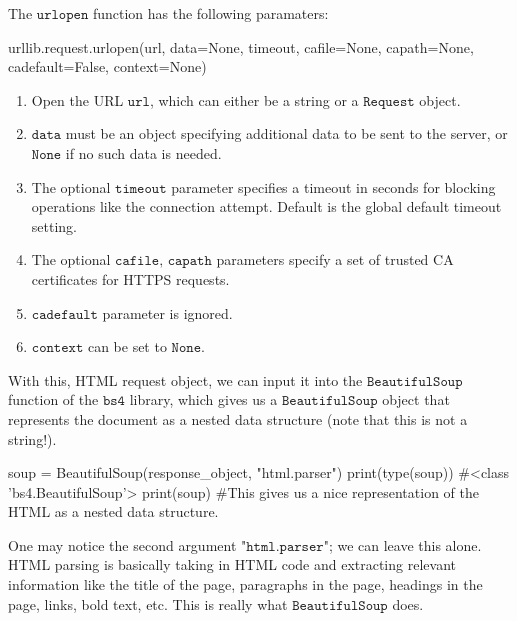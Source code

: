 \documentclass{article}
\begin{document}
  \begin{definition}
  The $\texttt{urlopen}$ function has the following paramaters: 
  \begin{python}
  urllib.request.urlopen(url, data=None, timeout, cafile=None, capath=None, cadefault=False, context=None)
  \end{python}
  \begin{enumerate}
      \item Open the URL $\texttt{url}$, which can either be a string or a $\texttt{Request}$ object. 
      \item $\texttt{data}$ must be an object specifying additional data to be sent to the server, or $\texttt{None}$ if no such data is needed. 
      \item The optional $\texttt{timeout}$ parameter specifies a timeout in seconds for blocking operations like the connection attempt. Default is the global default timeout setting. 
      \item The optional $\texttt{cafile, capath}$ parameters specify a set of trusted CA certificates for HTTPS requests. 
      \item $\texttt{cadefault}$ parameter is ignored. 
      \item $\texttt{context}$ can be set to $\texttt{None}$. 
  \end{enumerate}
  \end{definition}
  With this, HTML request object, we can input it into the $\texttt{BeautifulSoup}$ function of the $\texttt{bs4}$ library, which gives us a $\texttt{BeautifulSoup}$ object that represents the document as a nested data structure (note that this is not a string!). 
  \begin{python}
  soup = BeautifulSoup(response_object, "html.parser")
  print(type(soup))     #<class 'bs4.BeautifulSoup'>
  print(soup)
  #This gives us a nice representation of the HTML as a nested data structure.
  \end{python}
  One may notice the second argument $\texttt{"html.parser"}$; we can leave this alone. HTML parsing is basically taking in HTML code and extracting relevant information like the title of the page, paragraphs in the page, headings in the page, links, bold text, etc. This is really what $\texttt{BeautifulSoup}$ does. 
\end{document}
